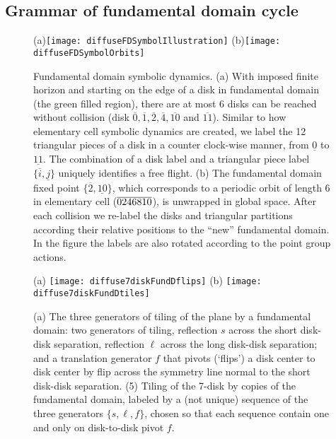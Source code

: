 \documentclass[aps,pre,
                showpacs,
                twocolumn,
                groupedaddress,
                floatfix]{revtex4-1}
\begin{document}
\subsection{Grammar of fundamental domain cycle}
\begin{figure}[htbp]
  (a)\texttt{[image: diffuseFDSymbolIllustration]}
  (b)\texttt{[image: diffuseFDSymbolOrbits]}

  \caption{\label{fig-fdflights} Fundamental domain symbolic dynamics. (a) With
  imposed finite horizon and starting on the edge of a disk in fundamental
  domain (the green filled region), there are at most 6 disks can be reached
  without collision (disk
  $\overline{0},\overline{1},\overline{2},\overline{4},\overline{10}$ and
  $\overline{11}$). Similar to how elementary cell symbolic dynamics are
  created, we label the 12 triangular pieces of a disk in a counter clock-wise
  manner, from $\underline{0}$ to $\underline{11}$. The combination of a disk
  label and a triangular piece label $\{\overline{i},\underline{j}\}$ uniquely
  identifies a free flight. (b) The fundamental domain fixed point
  $\{\overline{2},\underline{10}\}$, which corresponds to a periodic orbit of
  length 6 in elementary cell (${\overline{0246810}}$), is unwrapped in global space.
  After each collision we re-label the disks and triangular partitions according
  their relative positions to the ``new'' fundamental domain. In the figure the
  labels are also rotated according to the point group actions.}
\end{figure}

\begin{figure}[htbp]
  \begin{center}
    (a) \texttt{[image: diffuse7diskFundDflips]}
    (b) \texttt{[image: diffuse7diskFundDtiles]}
  \end{center}
  \caption{\label{fig-7diskFundDflips} (a) The three generators of tiling of the
  plane by a fundamental domain: two generators of  tiling, reflection
  $s$ across the short disk-disk separation, reflection $\ell$ across the long
  disk-disk separation; and a translation generator $f$ that pivots (`flips') a
  disk center to disk center by flip across the symmetry line normal to the
  short disk-disk separation. (5) Tiling of the 7-disk by copies of the
  fundamental domain, labeled by a (not unique) sequence of the three generators
  $\{s,\ell,f\}$, chosen so that each sequence contain one and only on
  disk-to-disk pivot $f$. }
\end{figure}
\end{document}

